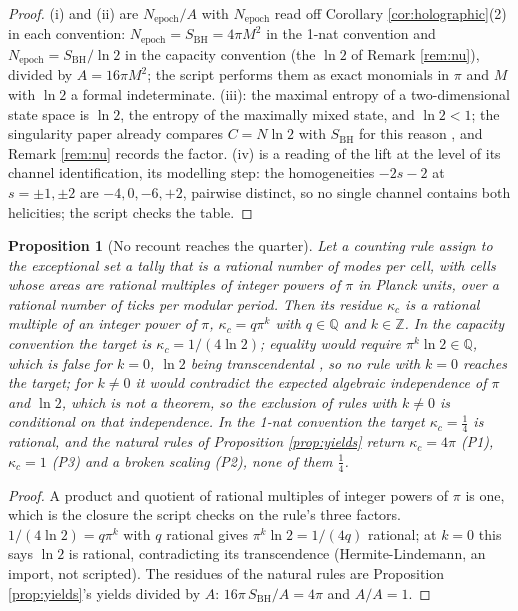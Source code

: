 \documentclass[11pt]{article}
\newtheorem{proposition}[theorem]{Proposition}
\theoremstyle{definition}
\newcommand{\SBH}{S_{\mathrm{BH}}}
\begin{document}
\begin{proof}
(i) and (ii) are $N_{\mathrm{epoch}}/A$ with $N_{\mathrm{epoch}}$ read off Corollary \ref{cor:holographic}(2) in each convention: $N_{\mathrm{epoch}} = \SBH = 4\pi M^2$ in the 1-nat convention and $N_{\mathrm{epoch}} = \SBH/\ln 2$ in the capacity convention (the $\ln 2$ of Remark \ref{rem:nu}), divided by $A = 16\pi M^2$; the script performs them as exact monomials in $\pi$ and $M$ with $\ln 2$ a formal indeterminate. (iii): the maximal entropy of a two-dimensional state space is $\ln 2$, the entropy of the maximally mixed state, and $\ln 2 < 1$; the singularity paper already compares $C = N\ln 2$ with $\SBH$ for this reason \cite[Prop.~10.7]{ButlerT5}, and Remark \ref{rem:nu} records the factor. (iv) is a reading of the lift at the level of its channel identification, its modelling step: the homogeneities $-2s - 2$ at $s = \pm 1, \pm 2$ are $-4, 0, -6, +2$, pairwise distinct, so no single channel contains both helicities; the script checks the table.
\end{proof}

\begin{proposition}[No recount reaches the quarter]\label{prop:norecount}
Let a counting rule assign to the exceptional set a tally that is a rational number of modes per cell, with cells whose areas are rational multiples of integer powers of $\pi$ in Planck units, over a rational number of ticks per modular period. Then its residue $\kappa_c$ is a rational multiple of an integer power of $\pi$, $\kappa_c = q\pi^k$ with $q \in \mathbb{Q}$ and $k \in \mathbb{Z}$. In the capacity convention the target is $\kappa_c = 1/(4\ln 2)$; equality would require $\pi^k\ln 2 \in \mathbb{Q}$, which is false for $k = 0$, $\ln 2$ being transcendental \cite[Thm.~1.4]{Baker1975}, so no rule with $k = 0$ reaches the target; for $k \neq 0$ it would contradict the expected algebraic independence of $\pi$ and $\ln 2$, which is not a theorem, so the exclusion of rules with $k \neq 0$ is conditional on that independence. In the 1-nat convention the target $\kappa_c = \tfrac14$ is rational, and the natural rules of Proposition \ref{prop:yields} return $\kappa_c = 4\pi$ (P1), $\kappa_c = 1$ (P3) and a broken scaling (P2), none of them $\tfrac14$.
\end{proposition}

\begin{proof}
A product and quotient of rational multiples of integer powers of $\pi$ is one, which is the closure the script checks on the rule's three factors. $1/(4\ln 2) = q\pi^k$ with $q$ rational gives $\pi^k\ln 2 = 1/(4q)$ rational; at $k = 0$ this says $\ln 2$ is rational, contradicting its transcendence (Hermite-Lindemann, an import, not scripted). The residues of the natural rules are Proposition \ref{prop:yields}'s yields divided by $A$: $16\pi\,\SBH/A = 4\pi$ and $A/A = 1$.
\end{proof}
\end{document}
